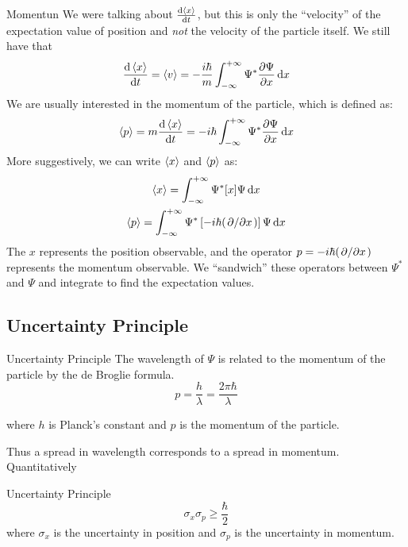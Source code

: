 \begin{frame}{Momentun}
	\small
	We were talking about $\dv{\ev x}{t}$, but this is only the ``velocity'' of the expectation value of position and \textit{not} the velocity of the particle itself. We still have that
	\[
		\dv{\ev x}{t} = \ev{v}  = -\frac{i\hbar}{m} \int_{-\infty}^{+\infty} \Psi^* \pdv{\Psi}{x} \dd{x}
	\]
	We are usually interested in the momentum of the particle, which is defined as:
	\begin{equation*}
		\ev p = m \dv{\ev x}{t} = -i\hbar \int_{-\infty}^{+\infty} \Psi^* \pdv{\Psi}{x} \dd{x}
	\end{equation*}
	More suggestively, we can write $\ev x$ and $\ev p$ as:
	\begin{gather*}
		\ev x =  \int_{-\infty}^{+\infty} \Psi^* [x] \Psi \dd{x}\\
		\ev p = \int_{-\infty}^{+\infty} \Psi^* \left[-i\hbar (\pdv*{x}) \right] \Psi \dd{x}
	\end{gather*}
	The $x$ represents the position observable, and the operator $ p = -i\hbar (\pdv*{x})$ represents the momentum observable. We ``sandwich'' these operators between $\Psi^*$ and $\Psi$ and integrate to find the expectation values.
\end{frame}


\subsection{Uncertainty Principle}

\begin{frame}{Uncertainty Principle}
The wavelength of $\Psi$ is related to the momentum of the particle by the de Broglie formula.
$$ p = \frac{h}{\lambda} = \frac{2\pi \hbar}{\lambda}$$

where $h$ is Planck's constant and $p$ is the momentum of the particle.

Thus a spread in wavelength corresponds to a spread in momentum. Quantitatively
\begin{block}{Uncertainty Principle}
	\begin{equation*}
		\sigma_x \sigma_p \ge \frac{\hbar}{2}
	\end{equation*}
	where $\sigma_x$ is the uncertainty in position and $\sigma_p$ is the uncertainty in momentum.
\end{block}

\end{frame}




